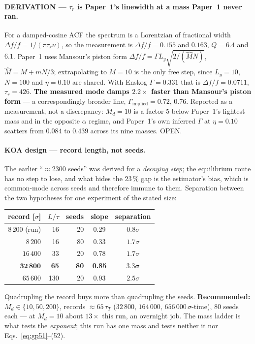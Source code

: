 \documentclass[11pt,a4paper]{article}
\begin{document}
\paragraph{DERIVATION --- $\tau_r$ is Paper~1's linewidth at a mass Paper~1 never ran.} For a
damped-cosine ACF the spectrum is a Lorentzian of fractional width $\Delta f/f = 1/(\pi\tau_r\nu)$,
so the measurement is $\Delta f/f = 0.155$ and $0.163$, $Q = 6.4$ and $6.1$. Paper~1 uses Mansour's
piston form $\Delta f/f = \Gamma L_y\sqrt{2/(\hat M N)}$, $\hat M = M + mN/3$; extrapolating to
$M = 10$ is the only free step, since $L_y = 10$, $N = 100$ and $\eta = 0.10$ are shared. With
Enskog $\Gamma = 0.331$ that is $\Delta f/f = 0.0711$, $\tau_r = 426$. \textbf{The measured
mode damps $2.2\times$ faster than Mansour's piston form} --- a correspondingly broader line,
$\Gamma_{\mathrm{implied}} = 0.72$, $0.76$. Reported as a
measurement, not a discrepancy: $M_d = 10$ is a factor 5 below Paper~1's lightest mass and in the
opposite $\alpha$ regime, and Paper~1's own inferred $\Gamma$ at $\eta = 0.10$ scatters from $0.084$
to $0.439$ across its nine masses. OPEN.

\paragraph{KOA design --- record length, not seeds.} The earlier ``$\approx 2300$ seeds'' was
derived for a \emph{decaying step}; the equilibrium route has no step to lose, and what hides the
$23\,\%$ gap is the estimator's bias, which is common-mode across seeds and therefore immune to
them. Separation between the two hypotheses for one experiment of the stated size:
\begin{center}
\begin{tabular}{rrrcc}
\toprule
record [$\sigma$] & $L/\tau$ & seeds & slope & separation \\
\midrule
$8\,200$ (run) & 16 & 20 & 0.29 & $0.8\sigma$ \\
$8\,200$ & 16 & 80 & 0.33 & $1.7\sigma$ \\
$16\,400$ & 33 & 20 & 0.78 & $1.7\sigma$ \\
$\mathbf{32\,800}$ & \textbf{65} & \textbf{80} & \textbf{0.85} & $\mathbf{3.3\sigma}$ \\
$65\,600$ & 130 & 20 & 0.93 & $2.5\sigma$ \\
\bottomrule
\end{tabular}
\end{center}
Quadrupling the record buys more than quadrupling the seeds. \textbf{Recommended:}
$M_d \in \{10, 50, 200\}$, records $\approx 65\,\tau_T$ ($32\,800$, $164\,000$,
$656\,000\,\sigma$-time), 80 seeds each --- at $M_d = 10$ about $13\times$ this run, an overnight
job. The mass ladder is what tests the \emph{exponent}; this run has one mass and tests neither it
nor Eqs.~\eqref{eq:gp51}--(52).
\end{document}
